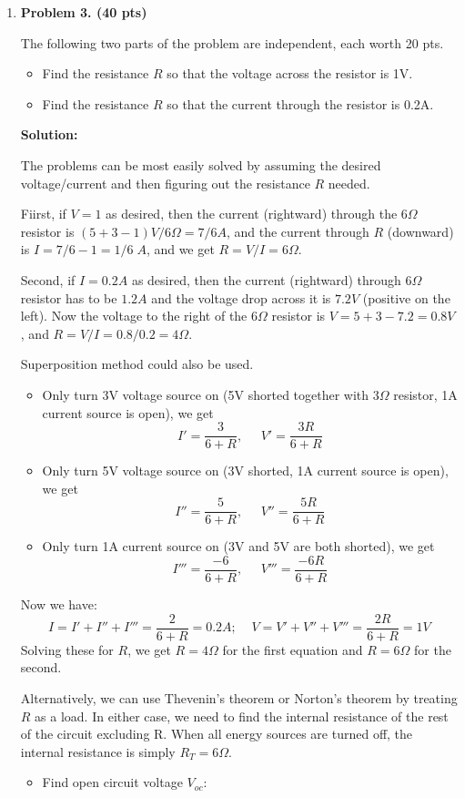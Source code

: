 \begin{enumerate}
\item {\bf Problem 3. (40 pts)}

  The following two parts of the problem are independent, each worth 20 pts.
  \begin{itemize}
    \item Find the resistance $R$ so that the voltage across the resistor is 1V.
    \item Find the resistance $R$ so that the current through the resistor is 0.2A.
  \end{itemize}

  
  {\bf Solution:} 

  The problems can be most easily solved by assuming the desired voltage/current
  and then figuring out the resistance $R$ needed. 

  Fiirst, if $V=1$ as desired, then the current (rightward) through the $6\Omega$ 
  resistor is $(5+3-1)V/6\Omega=7/6A$, and the current through $R$ (downward) is 
  $I=7/6-1=1/6\;A$, and we get $R=V/I=6\Omega$. 

  Second, if $I=0.2A$ as desired, then the current (rightward) through $6\Omega$
  resistor has to be $1.2A$ and the voltage drop across it is $7.2V$ (positive on
  the left). Now the voltage to the right of the $6\Omega$ resistor is $V=5+3-7.2=0.8V$,
  and $R=V/I=0.8/0.2=4\Omega$.

  Superposition method could also be used. 
  \begin{itemize}
    \item Only turn 3V voltage source on (5V shorted together with $3\Omega$ resistor, 1A
      current source is open), we get
      \[ I'=\frac{3}{6+R},\;\;\;\;\; V'=\frac{3R}{6+R} \]
    \item Only turn 5V voltage source on (3V shorted, 1A current source is open), we get
      \[ I''=\frac{5}{6+R},\;\;\;\;\; V''=\frac{5R}{6+R} \]
    \item Only turn 1A current source on (3V and 5V are both shorted), we get
      \[ I'''=\frac{-6}{6+R},\;\;\;\;\; V'''=\frac{-6R}{6+R} \]
  \end{itemize}
  Now we have:
  \[
  I=I'+I''+I'''=\frac{2}{6+R}=0.2A;\;\;\;\; V=V'+V''+V'''=\frac{2R}{6+R}=1V 
  \]
  Solving these for $R$, we get $R=4\Omega$ for the first equation and 
  $R=6\Omega$ for the second.

  Alternatively, we can use Thevenin's theorem or Norton's theorem by treating $R$
  as a load. In either case, we need to find the internal resistance of the rest
  of the circuit excluding R. When all energy sources are turned off, the internal 
  resistance is simply $R_T=6\Omega$. 
  \begin{itemize}
    \item Find open circuit voltage $V_{oc}$:


\end{itemize}
\end{enumerate}
